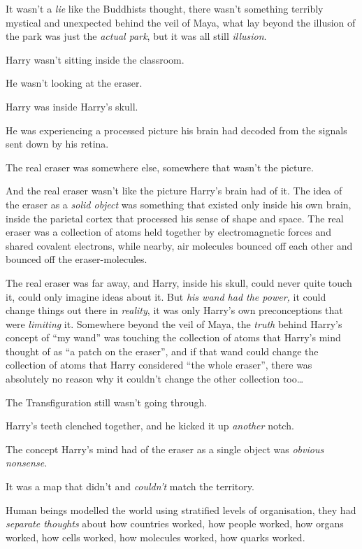 It wasn't a \emph{lie} like the Buddhists thought, there wasn't
something terribly mystical and unexpected behind the veil of Maya, what
lay beyond the illusion of the park was just the \emph{actual park}, but
it was all still \emph{illusion}.

Harry wasn't sitting inside the classroom.

He wasn't looking at the eraser.

Harry was inside Harry's skull.

He was experiencing a processed picture his brain had decoded from the
signals sent down by his retina.

The real eraser was somewhere else, somewhere that wasn't the picture.

And the real eraser wasn't like the picture Harry's brain had of it. The
idea of the eraser as a \emph{solid object} was something that existed
only inside his own brain, inside the parietal cortex that processed his
sense of shape and space. The real eraser was a collection of atoms held
together by electromagnetic forces and shared covalent electrons, while
nearby, air molecules bounced off each other and bounced off the
eraser-molecules.

The real eraser was far away, and Harry, inside his skull, could never
quite touch it, could only imagine ideas about it. But \emph{his wand
had the power,} it could change things out there in \emph{reality}, it
was only Harry's own preconceptions that were \emph{limiting} it.
Somewhere beyond the veil of Maya, the \emph{truth} behind Harry's
concept of ``my wand'' was touching the collection of atoms that Harry's
mind thought of as ``a patch on the eraser'', and if that wand could
change the collection of atoms that Harry considered ``the whole
eraser'', there was absolutely no reason why it couldn't change the
other collection too\ldots{}

The Transfiguration still wasn't going through.

Harry's teeth clenched together, and he kicked it up \emph{another}
notch.

The concept Harry's mind had of the eraser as a single object was
\emph{obvious nonsense.}

It was a map that didn't and \emph{couldn't} match the territory.

Human beings modelled the world using stratified levels of organisation,
they had \emph{separate thoughts} about how countries worked, how people
worked, how organs worked, how cells worked, how molecules worked, how
quarks worked.


